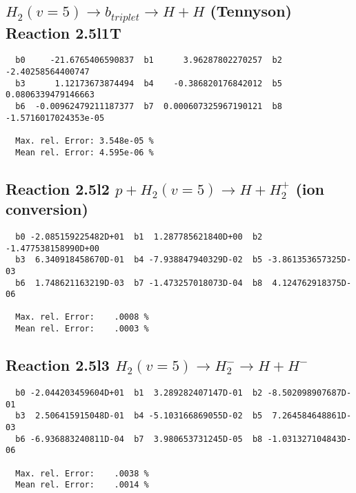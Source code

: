 \documentclass[12pt]{article}
\begin{document}
\subsection{
$  H_2(v=5) \rightarrow b_{triplet}\rightarrow H + H $ (Tennyson)
Reaction 2.5l1T
}

\begin{small}\begin{verbatim}
  b0     -21.6765406590837  b1      3.96287802270257  b2     -2.40258564400747
  b3      1.12173673874494  b4    -0.386820176842012  b5    0.0806339479146663
  b6  -0.00962479211187377  b7  0.000607325967190121  b8  -1.5716017024353e-05

  Max. rel. Error: 3.548e-05 %
  Mean rel. Error: 4.595e-06 %
\end{verbatim}\end{small}


\subsection{
Reaction 2.5l2
$ p + H_2(v=5) \rightarrow H + H_2^+$ (ion conversion)
}


\begin{small}\begin{verbatim}
  b0 -2.085159225482D+01  b1  1.287785621840D+00  b2 -1.477538158990D+00
  b3  6.340918458670D-01  b4 -7.938847940329D-02  b5 -3.861353657325D-03
  b6  1.748621163219D-03  b7 -1.473257018073D-04  b8  4.124762918375D-06

  Max. rel. Error:    .0008 %
  Mean rel. Error:    .0003 %

\end{verbatim}\end{small}


\subsection{
Reaction 2.5l3
 $ H_2(v=5) \rightarrow H_2^- \rightarrow H + H^-$
}


\begin{small}\begin{verbatim}
  b0 -2.044203459604D+01  b1  3.289282407147D-01  b2 -8.502098907687D-01
  b3  2.506415915048D-01  b4 -5.103166869055D-02  b5  7.264584648861D-03
  b6 -6.936883240811D-04  b7  3.980653731245D-05  b8 -1.031327104843D-06

  Max. rel. Error:    .0038 %
  Mean rel. Error:    .0014 %

\end{verbatim}\end{small}
\end{document}
